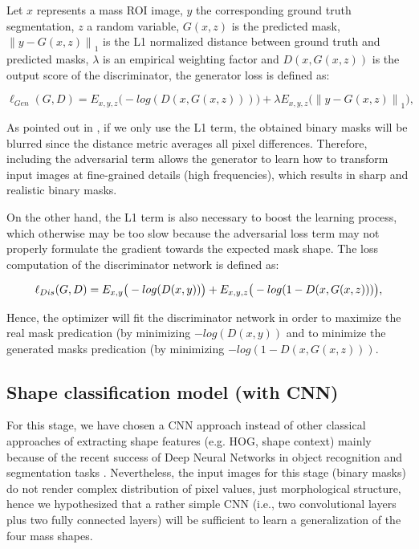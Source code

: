 \documentclass[runningheads,a4paper]{llncs}
\newcommand\norm[1]{\left\lVert#1\right\rVert}
\begin{document}
Let $x$ represents a mass ROI image, $y$ the corresponding ground truth segmentation, $z$ a random variable, $G(x, z)$ is the predicted mask, $\norm{ y-G(x, z)}_{1}$ is the L1 normalized distance between ground truth and predicted masks, $\lambda$ is an empirical weighting factor and $D(x, G(x, z))$ is the output score of the discriminator, the generator loss is defined as:

\begin{equation}
\ell_{Gen} (G,D) = E_{x,y,z} \big(-log (D(x,G(x,z)))\big)+ \lambda E_{x,y,z} \big(\norm{y-G(x,z)}_{1}\big),
\end{equation}

As pointed out in \cite{isola2017image}, if we only use the L1 term, the obtained binary masks will be blurred since the distance metric averages all pixel differences. Therefore, including the adversarial term allows the generator to learn how to transform input images at fine-grained details (high frequencies), which results in sharp and realistic binary masks.

On the other hand, the L1 term is also necessary to boost the learning process, which otherwise may be too slow because the adversarial loss term may not properly formulate the gradient towards the expected mask shape.
The loss computation of the discriminator network is defined as:

\begin{equation}
\small
\ell_{Dis} (G,D) = E_{x,y} \big(-log (D(x,y))\big)+ E_{x,y,z} \big(-log (1-D(x,G(x,z)))\big),
\end{equation}

Hence, the optimizer will fit the discriminator network in order to maximize the real mask predication (by minimizing $-log (D(x, y))$ and to minimize the generated masks predication (by minimizing $-log (1-D(x, G(x, z)))$.


\subsection{Shape classification model (with CNN) }

For this stage, we have chosen a CNN approach instead of other classical approaches of extracting shape features (e.g. HOG, shape context) mainly because of the recent success of Deep Neural Networks in object recognition and segmentation tasks \cite{litjens2017survey}. Nevertheless, the input images for this stage (binary masks) do not render complex distribution of pixel values, just morphological structure, hence we hypothesized that a rather simple CNN (i.e., two convolutional layers plus two fully connected layers) will be sufficient to learn a generalization of the four mass shapes.
\end{document}
